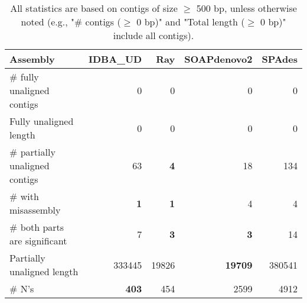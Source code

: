 \documentclass[12pt,a4paper]{article}
\begin{document}
\begin{table}[ht]
\begin{center}
\caption{All statistics are based on contigs of size $\geq$ 500 bp, unless otherwise noted (e.g., "\# contigs ($\geq$ 0 bp)" and "Total length ($\geq$ 0 bp)" include all contigs).}
\begin{tabular}{|l*{4}{|r}|}
\hline
Assembly & IDBA\_UD & Ray & SOAPdenovo2 & SPAdes \\ \hline
\# fully unaligned contigs & 0 & 0 & 0 & 0 \\ \hline
Fully unaligned length & 0 & 0 & 0 & 0 \\ \hline
\# partially unaligned contigs & 63 & {\bf 4} & 18 & 134 \\ \hline
\hspace{5mm}\# with misassembly & {\bf 1} & {\bf 1} & 4 & 4 \\ \hline
\hspace{5mm}\# both parts are significant & 7 & {\bf 3} & {\bf 3} & 14 \\ \hline
Partially unaligned length & 333445 & 19826 & {\bf 19709} & 380541 \\ \hline
\# N's & {\bf 403} & 454 & 2599 & 4912 \\ \hline
\end{tabular}
\end{center}
\end{table}
\end{document}
